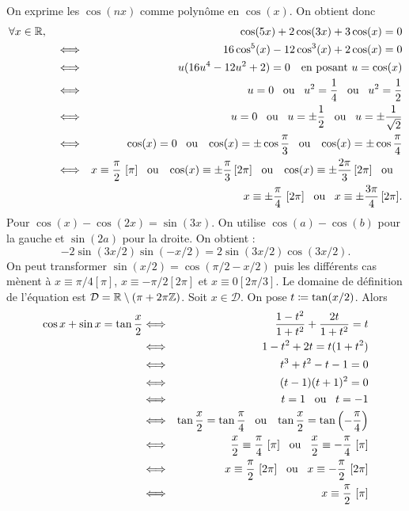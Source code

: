\documentclass{magnolia}
\begin{document}
\begin{sol}
\begin{questions}
\question On exprime les $\cos(nx)$ comme polynôme en $\cos(x)$. On obtient donc
  \begin{eqnarray*}
\forall x\in\R\qsep & & \cos(5x)+2\cos (3x)+3\cos(x)=0\\
&\ssi& 16\cos^5(x)-12\cos^3(x)+2\cos(x)=0\\
&\ssi& u(16 u^4-12u^2+2)=0 \quad\text{en posant $u=\cos(x)$}\\
&\ssi& u = 0 \ou u^2=\frac{1}{4} \ou u^2=\frac{1}{2}\\
&\ssi& u =0 \ou u =\pm\frac{1}{2} \ou u=\pm\frac{1}{\sqrt{2}}\\
&\ssi& \cos(x)=0 \ou \cos(x)=\pm\cos\frac{\pi}{3} \ou \cos(x)=\pm\cos\frac{\pi}{4}\\
&\ssi& x\equiv\frac{\pi}{2}\ [\pi]\ou\cos(x)\equiv\pm\frac{\pi}{3}\, [2\pi]\ou\cos(x)\equiv\pm\frac{2\pi}{3}\, [2\pi]\ou\\
&    & x\equiv\pm\frac{\pi}{4}\ [2\pi]\ou x\equiv\pm\frac{3\pi}{4}\, [2\pi].
  \end{eqnarray*}
Pour $\cos(x)-\cos(2x)=\sin(3x)$. On utilise $\cos(a)-\cos(b)$ pour la gauche et $\sin(2a)$ pour la droite. On obtient :
$$-2\sin(3x/2)\sin(-x/2)=2\sin(3x/2)\cos(3x/2).$$
On peut transformer $\sin(x/2)=\cos(\pi/2-x/2)$ puis les différents cas mènent à $x\equiv \pi/4 [\pi]$, $x\equiv -\pi/2 [2\pi]$ et $x\equiv 0 [2\pi/3]$.
\question Le domaine de définition de l'équation est $\mathcal{D}=\mathbb{R}\setminus\left(\pi+2\pi\mathbb{Z}\right)$. Soit $x\in\mathcal{D}$. On pose $t\coloneqq\tan(x/2)$. Alors
  \begin{eqnarray*}
\cos x+\sin x=\tan\frac{x}{2}
&\ssi& \frac{1-t^2}{1+t^2}+\frac{2t}{1+t^2}=t\\
&\ssi& 1-t^2+2t=t(1+t^2)\\
&\ssi& t^3+t^2-t-1=0\\
&\ssi& (t-1)(t+1)^2=0\\
&\ssi& t=1 \ou t=-1\\
&\ssi& \tan\frac{x}{2}=\tan\frac{\pi}{4} \ou \tan\frac{x}{2}=\tan\p{-\frac{\pi}{4}}\\
&\ssi& \frac{x}{2}\equiv\frac{\pi}{4}\ [\pi] \ou \frac{x}{2}\equiv-\frac{\pi}{4}\ [\pi]\\
&\ssi& x\equiv\frac{\pi}{2}\ [2\pi] \ou x\equiv-\frac{\pi}{2}\ [2\pi]\\
&\ssi& x\equiv\frac{\pi}{2}\ [\pi]
  \end{eqnarray*}
\end{questions}
\end{sol}
\end{document}
